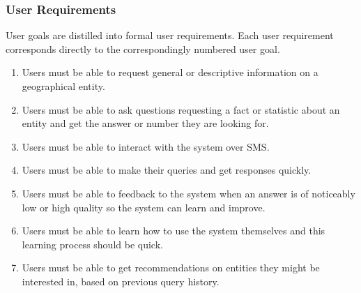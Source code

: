 \documentclass{article}
\begin{document}
\subsubsection{User Requirements}
User goals are distilled into formal user requirements.  Each user requirement corresponds directly to the correspondingly numbered user goal.
\begin{enumerate}
  \item Users must be able to request general or descriptive information on a geographical entity.
  \item Users must be able to ask questions requesting a fact or statistic about an entity and get the answer or number they are looking for.
  \item Users must be able to interact with the system over SMS.
  \item Users must be able to make their queries and get responses quickly.
  \item Users must be able to feedback to the system when an answer is of noticeably low or high quality so the system can learn and improve.
  \item Users must be able to learn how to use the system themselves and this learning process should be quick.
  \item Users must be able to get recommendations on entities they might be interested in, based on previous query history.
\end{enumerate}
\end{document}
